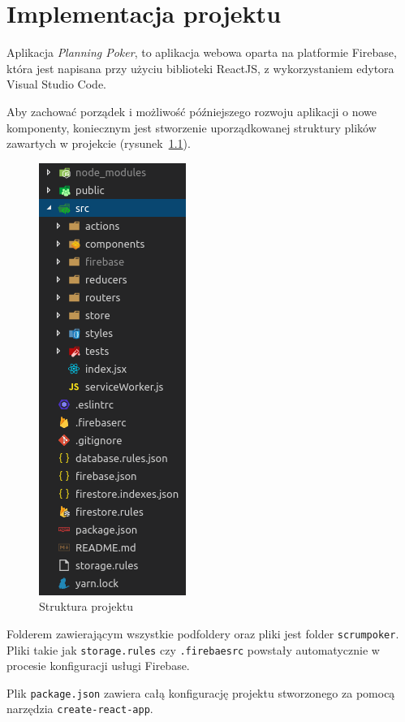 
\chapter{Implementacja projektu}

Aplikacja \textit{Planning Poker}, to aplikacja webowa oparta na platformie Firebase,
która jest napisana przy użyciu biblioteki ReactJS, z wykorzystaniem
edytora Visual Studio Code.

Aby zachować porządek i możliwość późniejszego rozwoju aplikacji o nowe komponenty,
koniecznym jest stworzenie uporządkowanej struktury plików zawartych w projekcie
(rysunek~\ref{rys:projekt}).

\begin{figure}[h]
	\centering\includegraphics[width=.3\textwidth]{img/projekt.png}
	\caption{Struktura projektu}\label{rys:projekt}%
\end{figure}

Folderem zawierającym wszystkie podfoldery oraz pliki jest folder \texttt{scrumpoker}.
Pliki takie jak \texttt{storage.rules} czy \texttt{.firebaesrc} powstały automatycznie
w procesie konfiguracji usługi Firebase.

Plik \texttt{package.json} zawiera całą konfigurację projektu stworzonego
za pomocą narzędzia \texttt{create-react-app}.

